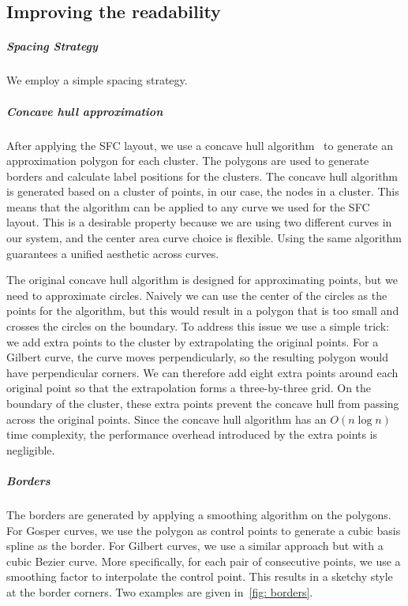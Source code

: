 \subsection{Improving the readability}
\subparagraph{Spacing Strategy}
We employ a simple spacing strategy.

\subparagraph{Concave hull approximation}
After applying the SFC layout, we use a concave hull algorithm~\cite{park2012concavehull} to generate an approximation polygon for each cluster.
The polygons are used to generate borders and calculate label positions for the clusters.
The concave hull algorithm is generated based on a cluster of points, in our case, the nodes in a cluster.
This means that the algorithm can be applied to any curve we used for the SFC layout.
This is a desirable property because we are using two different curves in our system, and the center area curve choice is flexible.
Using the same algorithm guarantees a unified aesthetic across curves.

The original concave hull algorithm is designed for approximating points, but we need to approximate circles.
Naively we can use the center of the circles as the points for the algorithm, but this would result in a polygon that is too small and crosses the circles on the boundary.
To address this issue we use a simple trick: we add extra points to the cluster by extrapolating the original points.
For a Gilbert curve, the curve moves perpendicularly, so the resulting polygon would have perpendicular corners. 
We can therefore add eight extra points around each original point so that the extrapolation forms a three-by-three grid.
On the boundary of the cluster, these extra points prevent the concave hull from passing across the original points.
Since the concave hull algorithm has an $O(n\log n)$ time complexity, the performance overhead introduced by the extra points is negligible.
\subparagraph{Borders} 
The borders are generated by applying a smoothing algorithm on the polygons.
For Gosper curves, we use the polygon as control points to generate a cubic basis spline as the border.
For Gilbert curves, we use a similar approach but with a cubic Bezier curve.
More specifically, for each pair of consecutive points, we use a smoothing factor to interpolate the control point.
This results in a sketchy style at the border corners.
Two examples are given in~\autoref{fig: borders}.

